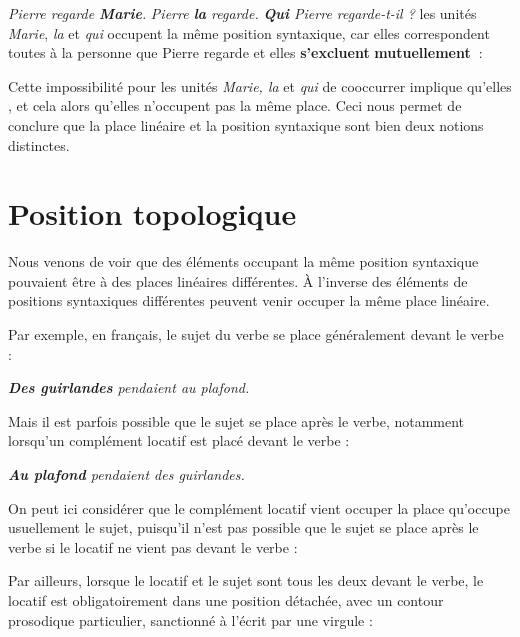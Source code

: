 \ea
  \ea \textit{{Pierre regarde} \textbf{{Marie}}.}
  \ex \textit{{Pierre} \textbf{{la}}  {regarde.}}
  \ex \textit{\textbf{{Qui}}  {Pierre regarde-t-il} ?}
  \z
\z
les unités  \textit{Marie}, \textit{la} et \textit{qui} occupent la même position syntaxique, car elles correspondent toutes à la personne que Pierre regarde et elles \textbf{s’excluent} \textbf{mutuellement~}:

\ea
{}
\z
\z

Cette impossibilité pour les unités \textit{Marie, la} et \textit{qui} de cooccurrer implique qu’elles , et cela alors qu’elles n’occupent pas la même place. Ceci nous permet de conclure que la place linéaire et la position syntaxique sont bien deux notions distinctes.

\section{Position topologique}\label{sec:3.5.4}

Nous venons de voir que des éléments occupant la même position syntaxique pouvaient être à des places linéaires différentes. À l’inverse des éléments de positions syntaxiques différentes peuvent venir occuper la même place linéaire.

Par exemple, en français, le sujet du verbe se place généralement devant le verbe :

\ea
\textit{\textbf{{Des guirlandes}}  {pendaient au plafond}.}
\z

Mais il est parfois possible que le sujet se place après le verbe, notamment lorsqu’un complément locatif est placé devant le verbe :

\ea
\textit{\textbf{{Au plafond}}  {pendaient des guirlandes}.}
\z

On peut ici considérer que le complément locatif vient occuper la place qu’occupe usuellement le sujet, puisqu’il n’est pas possible que le sujet se place après le verbe si le locatif ne vient pas devant le verbe :

\ea
{}
\z
\z

Par ailleurs, lorsque le locatif et le sujet sont tous les deux devant le verbe, le locatif est obligatoirement dans une position détachée, avec un contour prosodique particulier, sanctionné à l’écrit par une virgule :

